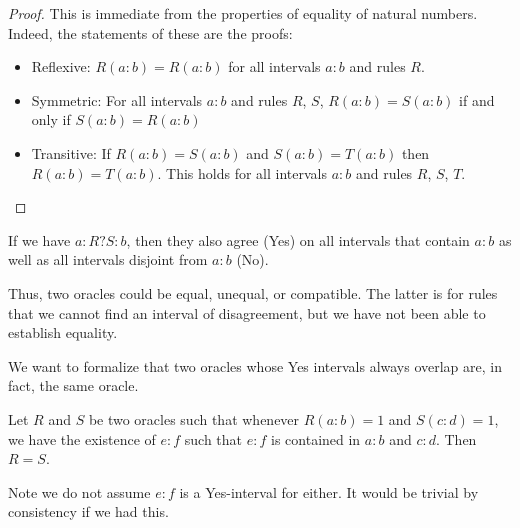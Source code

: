 \documentclass[12pt]{article}
\begin{document}
\begin{proof}
This is immediate from the properties of equality of natural numbers. Indeed, the statements of these are the proofs:
\begin{itemize}
    \item Reflexive: $R(a:b)=R(a:b)$ for all intervals $a:b$ and rules $R$.
    \item Symmetric: For all intervals $a:b$ and rules $R$, $S$, $R(a:b)=S(a:b)$ if and only if $S(a:b) = R(a:b)$ 
    \item Transitive: If $R(a:b)=S(a:b)$ and $S(a:b) = T(a:b)$ then $R(a:b)=T(a:b)$. This holds for all intervals $a:b$ and rules $R$, $S$, $T$.
\end{itemize}
\end{proof}

If we have $a:R?S:b$, then they also agree (Yes) on all intervals that contain $a:b$ as well as all intervals disjoint from $a:b$ (No). 

Thus, two oracles could be equal, unequal, or compatible. The latter is for rules that we cannot find an interval of disagreement, but we have not been able to establish equality. 

We want to formalize that two oracles whose Yes intervals always overlap are, in fact, the same oracle.

\begin{proposition}\label{pr:overlap}
Let $R$ and $S$ be two oracles such that whenever $R(a:b)=1$ and $S(c:d)=1$, we have the existence of $e:f$ such that $e:f$ is contained in $a:b$ and $c:d$.  Then $R =S$.
\end{proposition}

Note we do not assume $e:f$ is a Yes-interval for either. It would be trivial by consistency if we had this. 
\end{document}
